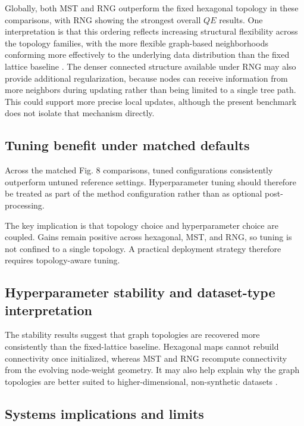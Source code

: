 \documentclass[10pt]{article} %
\begin{document}
Globally, both MST and RNG outperform the fixed hexagonal topology in these comparisons, with RNG showing the strongest overall $QE$ results. One interpretation is that this ordering reflects increasing structural flexibility across the topology families, with the more flexible graph-based neighborhoods conforming more effectively to the underlying data distribution than the fixed lattice baseline \citep{kohonenEssentialsSelforganizingMap2013,kangasVariantsSelforganizingMaps1990,toussaintRelativeNeighbourhoodGraph1980}. The denser connected structure available under RNG may also provide additional regularization, because nodes can receive information from more neighbors during updating rather than being limited to a single tree path. This could support more precise local updates, although the present benchmark does not isolate that mechanism directly.

\subsection{Tuning benefit under matched defaults}

Across the matched Fig. 8 comparisons, tuned configurations consistently outperform untuned reference settings. Hyperparameter tuning should therefore be treated as part of the method configuration rather than as optional post-processing.

The key implication is that topology choice and hyperparameter choice are coupled. Gains remain positive across hexagonal, MST, and RNG, so tuning is not confined to a single topology. A practical deployment strategy therefore requires topology-aware tuning.

\subsection{Hyperparameter stability and dataset-type interpretation}

The stability results suggest that graph topologies are recovered more consistently than the fixed-lattice baseline. Hexagonal maps cannot rebuild connectivity once initialized, whereas MST and RNG recompute connectivity from the evolving node-weight geometry. It may also help explain why the graph topologies are better suited to higher-dimensional, non-synthetic datasets \citep{kohonenEssentialsSelforganizingMap2013,kangasVariantsSelforganizingMaps1990}.

\subsection{Systems implications and limits}
\end{document}
